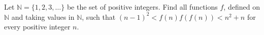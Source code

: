 Let $\mathbb{N} = \{1, 2, 3, \ldots\}$ be the set of positive integers. Find all functions $f$,  defined on $\mathbb{N}$ and taking values in $\mathbb{N}$,  such that $(n-1)^2< f(n)f(f(n)) < n^2+n$ for every positive integer $n$.